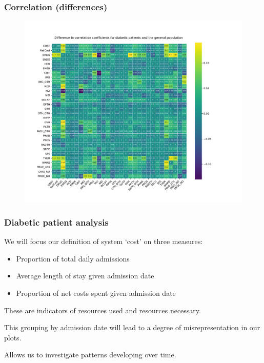 \documentclass{beamer}
\begin{document}
\begin{frame}
    \frametitle{Correlation (differences)}

    \vspace{-15pt}
    \begin{figure}
        \includegraphics[width=\linewidth]{./img/differences_corr_heatmap.pdf}
    \end{figure}
\end{frame}

\begin{frame}
    \frametitle{Diabetic patient analysis}

    We will focus our definition of system `cost' on three measures:

    \pause%
    \begin{itemize}
        \item Proportion of total daily admissions
        \item Average length of stay given admission date
        \item Proportion of net costs spent given admission date
    \end{itemize}

    \pause%
    \vspace{10pt}
    These are indicators of resources used and resources necessary.

    \vspace{10pt}
    This grouping by admission date will lead to a degree of misrepresentation
    in our plots.

    \vspace{10pt}
    Allows us to investigate patterns developing over time.
\end{frame}
\end{document}
